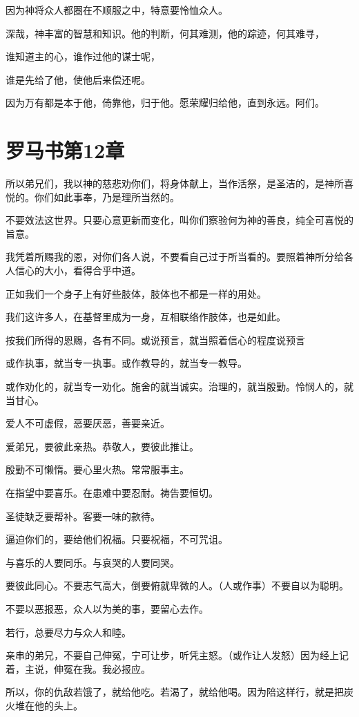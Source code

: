 \documentclass[12pt,oneside]{book}
\begin{document}
因为神将众人都圈在不顺服之中，特意要怜恤众人。

深哉，神丰富的智慧和知识。他的判断，何其难测，他的踪迹，何其难寻，

谁知道主的心，谁作过他的谋士呢，

谁是先给了他，使他后来偿还呢。

因为万有都是本于他，倚靠他，归于他。愿荣耀归给他，直到永远。阿们。

\chapter{罗马书第12章}
所以弟兄们，我以神的慈悲劝你们，将身体献上，当作活祭，是圣洁的，是神所喜悦的。你们如此事奉，乃是理所当然的。

不要效法这世界。只要心意更新而变化，叫你们察验何为神的善良，纯全可喜悦的旨意。

我凭着所赐我的恩，对你们各人说，不要看自己过于所当看的。要照着神所分给各人信心的大小，看得合乎中道。

正如我们一个身子上有好些肢体，肢体也不都是一样的用处。

我们这许多人，在基督里成为一身，互相联络作肢体，也是如此。

按我们所得的恩赐，各有不同。或说预言，就当照着信心的程度说预言

或作执事，就当专一执事。或作教导的，就当专一教导。

或作劝化的，就当专一劝化。施舍的就当诚实。治理的，就当殷勤。怜悯人的，就当甘心。

爱人不可虚假，恶要厌恶，善要亲近。

爱弟兄，要彼此亲热。恭敬人，要彼此推让。

殷勤不可懒惰。要心里火热。常常服事主。

在指望中要喜乐。在患难中要忍耐。祷告要恒切。

圣徒缺乏要帮补。客要一味的款待。

逼迫你们的，要给他们祝福。只要祝福，不可咒诅。

与喜乐的人要同乐。与哀哭的人要同哭。

要彼此同心。不要志气高大，倒要俯就卑微的人。（人或作事）不要自以为聪明。

不要以恶报恶，众人以为美的事，要留心去作。

若行，总要尽力与众人和睦。

亲串的弟兄，不要自己伸冤，宁可让步，听凭主怒。（或作让人发怒）因为经上记着，主说，伸冤在我。我必报应。

所以，你的仇敌若饿了，就给他吃。若渴了，就给他喝。因为陪这样行，就是把炭火堆在他的头上。
\end{document}
